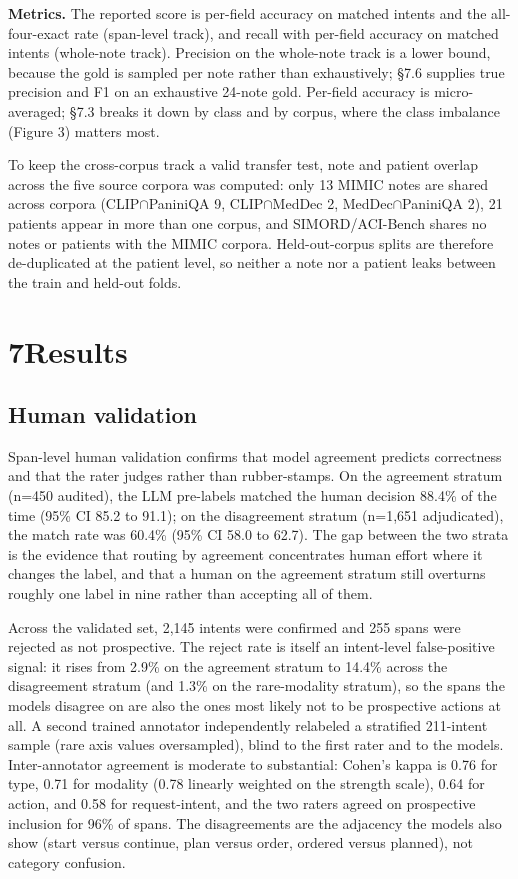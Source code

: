 \textbf{Metrics.} The reported score is per-field accuracy on matched intents and the all-four-exact rate (span-level track), and recall with per-field accuracy on matched intents (whole-note track). Precision on the whole-note track is a lower bound, because the gold is sampled per note rather than exhaustively; §7.6 supplies true precision and F1 on an exhaustive 24-note gold. Per-field accuracy is micro-averaged; §7.3 breaks it down by class and by corpus, where the class imbalance (Figure 3) matters most.

To keep the cross-corpus track a valid transfer test, note and patient overlap across the five source corpora was computed: only 13 MIMIC notes are shared across corpora (CLIP$\cap$PaniniQA 9, CLIP$\cap$MedDec 2, MedDec$\cap$PaniniQA 2), 21 patients appear in more than one corpus, and SIMORD/ACI-Bench shares no notes or patients with the MIMIC corpora. Held-out-corpus splits are therefore de-duplicated at the patient level, so neither a note nor a patient leaks between the train and held-out folds.

\section{\texorpdfstring{{7}Results}{7Results}}\label{results}

\subsection{Human validation}\label{human-validation}

Span-level human validation confirms that model agreement predicts correctness and that the rater judges rather than rubber-stamps. On the agreement stratum (n=450 audited), the LLM pre-labels matched the human decision 88.4\% of the time (95\% CI 85.2 to 91.1); on the disagreement stratum (n=1,651 adjudicated), the match rate was 60.4\% (95\% CI 58.0 to 62.7). The gap between the two strata is the evidence that routing by agreement concentrates human effort where it changes the label, and that a human on the agreement stratum still overturns roughly one label in nine rather than accepting all of them.

Across the validated set, 2,145 intents were confirmed and 255 spans were rejected as not prospective. The reject rate is itself an intent-level false-positive signal: it rises from 2.9\% on the agreement stratum to 14.4\% across the disagreement stratum (and 1.3\% on the rare-modality stratum), so the spans the models disagree on are also the ones most likely not to be prospective actions at all. A second trained annotator independently relabeled a stratified 211-intent sample (rare axis values oversampled), blind to the first rater and to the models. Inter-annotator agreement is moderate to substantial: Cohen's kappa is 0.76 for type, 0.71 for modality (0.78 linearly weighted on the strength scale), 0.64 for action, and 0.58 for request-intent, and the two raters agreed on prospective inclusion for 96\% of spans. The disagreements are the adjacency the models also show (start versus continue, plan versus order, ordered versus planned), not category confusion.

